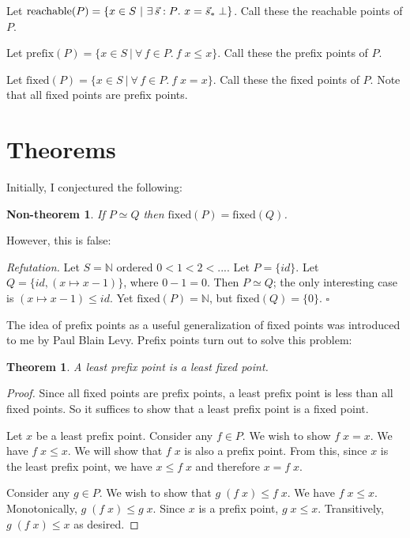 \documentclass{article}
\newcommand{\fa}[1]{\forall\,{#1}.\ }
\newcommand{\te}[1]{\exists\,{#1}.\ }
\newcommand{\N}{\mathbb{N}}
\newcommand{\setof}[2]{\{{#1}~|~{#2}\}}
\newcommand{\todo}[1]{{\color{red}{#1}}}
\newtheorem{theorem}{Theorem}
\newtheorem{nontheorem}{Non-theorem}
\newenvironment{refutation}
  {\vspace{0.5em}\noindent\textit{Refutation.}}
  {\hfill$\square$\vspace{0.5em}}
\begin{document}
\todo{Could I instead (or additionally) consider sets closed under composition
  and identity? Hm...}

\newcommand{\prefix}[1]{\ensuremath{\text{prefix}(#1)}}
\newcommand{\fixed}[1]{\ensuremath{\text{fixed}(#1)}}
\newcommand{\reach}[1]{\ensuremath{\text{reachable}(#1)}}

Let $\reach{P} = \setof{x \in S}{\te{\vec{s} : P} x = \seq{s}\; \bot}$. Call
these the reachable points of $P$.

Let $\prefix{P} = \setof{x \in S}{\fa{f \in P} f\; x \le x}$. Call these the prefix points of $P$.

Let $\fixed{P} = \setof{x \in S}{\fa{f \in P} f\;x = x}$. Call these the fixed
points of $P$. Note that all fixed points are prefix points.


\section{Theorems}

Initially, I conjectured the following:

\begin{nontheorem}
  If $P \simeq Q$ then $\fixed{P} = \fixed{Q}$.
\end{nontheorem}

However, this is false:

\begin{refutation}
  Let $S = \N$ ordered $0 < 1 < 2 < ...$. Let $P = \{id\}$. Let $Q = \{id, (x
  \mapsto x - 1)\}$, where $0 - 1 = 0$. Then $P \simeq Q$; the only interesting
  case is $(x \mapsto x - 1) \le id$. Yet $\fixed{P} = \N$, but $\fixed{Q} =
  \{0\}$.
\end{refutation}

The idea of prefix points as a useful generalization of fixed points was
introduced to me by Paul Blain Levy. Prefix points turn out to solve this
problem:

\begin{theorem}
  A least prefix point is a least fixed point.
\end{theorem}

\begin{proof}
  Since all fixed points are prefix points, a least prefix point is less than
  all fixed points. So it suffices to show that a least prefix point is a fixed
  point.

  Let $x$ be a least prefix point. Consider any $f \in P$. We wish to show $f\;x
  = x$. We have $f\; x \le x$. We will show that $f\;x$ is also a prefix point.
  From this, since $x$ is the least prefix point, we have $x \le f\;x$ and
  therefore $x = f\;x$.

  Consider any $g \in P$. We wish to show that $g\;(f\;x) \le f\; x$. We have
  $f\;x \le x$. Monotonically, $g\;(f\;x) \le g\;x$. Since $x$ is a prefix
  point, $g\;x \le x$. Transitively, $g\;(f\;x) \le x$ as desired.
\end{proof}
\end{document}
